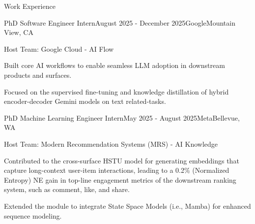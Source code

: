 \documentclass{resume} %
\begin{document}
\begin{rSection}{Work Experience}
\vspace{0.2cm}

\begin{rSubsection}{PhD Software Engineer Intern}{August 2025 - December 2025}{Google}{Mountain View, CA}
\item Host Team: Google Cloud - AI Flow 
\item Built core AI workflows to enable seamless LLM adoption in downstream products and surfaces.
\item Focused on the supervised fine-tuning and knowledge distillation of hybrid encoder-decoder Gemini models on text related-tasks. 
\end{rSubsection}

\vspace{0.1cm}

\begin{rSubsection}{PhD Machine Learning Engineer Intern}{May 2025 - August 2025}{Meta}{Bellevue, WA}
\item Host Team: Modern Recommendation Systems (MRS) - AI Knowledge
\item Contributed to the cross-surface HSTU model for generating embeddings that capture long-context user-item interactions, leading to a 0.2\% (Normalized Entropy) NE gain in top-line engagement metrics of the downstream ranking system, such as comment, like, and share.
\item Extended the module to integrate State Space Models (i.e., Mamba) for enhanced sequence modeling.
\end{rSubsection}
\end{rSection}
\end{document}
